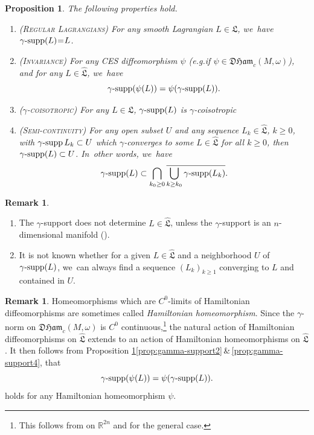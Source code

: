 \documentclass[10pt]{amsart}
\newtheorem{prop}[thm]{Proposition}
\theoremstyle{definition}
\newtheorem{rem}[thm]{Remark}
\DeclareMathOperator{\gammasupp}{\gamma\textup{-supp}}
\newcommand{\DHam}{\mathfrak{DHam}}
\newcommand{\fL}{\mathfrak {L}}
\newcommand{\hatL}{\widehat{\fL}}
\providecommand{\skpt}{\par\smallskip\noindent}
\providecommand{\eg}{e.g.}\providecommand{\ie}{i.e.}\providecommand{\etc}{etc.}
\begin{document}
\begin{prop}\label{prop:gamma-support}
The following properties hold.
\begin{enumerate}
\item\label{prop:gamma-support1}\!\!\textsc{(Regular Lagrangians)} For any smooth Lagrangian $L\!\in\!\fL$, we~have \hbox{$\gammasupp(L)\mkern-4mu=\mkern-4mu L$}.
\item\label{prop:gamma-support2}\!\!\textsc{(Invariance)} For any CES diffeomorphism $\psi$ (\eg if $\psi\in\DHam_c(M,\omega)$), and for any $L\in\hatL$, we~have\vspace*{-3pt}
\begin{equation*}
\gammasupp(\psi(L))=\psi(\gammasupp(L)).
\end{equation*}
\item\label{prop:gamma-support3}\!\!\label{Prop-2.13-3}\textsc{($\gamma$\nobreakdash-coisotropic)} For any $L\in\fL$, $\gammasupp(L)$ is $\gamma$\nobreakdash-coisotropic

\item\label{prop:gamma-support4}\!\!\textsc{(Semi-continuity)} For any open subset $U$ and any sequence $L_k\in\hatL$, $k\geq0$, with $\gammasupp L_k\subset U$ which $\gamma$\nobreakdash-converges to some $L\in\hatL$ for all $k\geq0$, then $\gammasupp(L)\subset U$. In~other words, we~have\vspace*{-3pt}
\[
\gammasupp(L)\subset\bigcap_{k_0\geq0}\overline{\bigcup_{k\geq k_0}\gammasupp(L_k)}.
\]
\end{enumerate}
\end{prop}

\skpt
\begin{rem}
\begin{enumerate}
\item The $\gamma$\nobreakdash-support does not determine $L\in \hatL$, unless the $\gamma$\nobreakdash-support is an $n$\nobreakdash-dimensional manifold (\cite{AGIV}).
\item It is not known whether for a given $L\in\hatL$ and a neighborhood $U$ of $\gammasupp(L)$, we~can always find a sequence $(L_k)_{k\geq 1}$ converging to $L$ and contained in $U$.
\end{enumerate}
\end{rem}

\begin{rem}\label{rem:sympeo} Homeomorphisms which are $C^0$-limits of Hamiltonian diffeomorphisms are sometimes called \emph{Hamiltonian homeomorphism}. Since the $\gamma$\nobreakdash-norm on $\DHam_c(M,\omega)$ is $C^0$ continuous,\footnote{This follows from \cite{Viterbo-STAGGF} on $\mathbb R^{2n}$ and \cite{BHS-C0} for the general case.} the natural action of Hamiltonian diffeomorphisms on $\hatL$ extends to an action of Hamiltonian homeomorphisms on $\hatL$. It then follows from Proposition \ref{prop:gamma-support}\eqref{prop:gamma-support2}\,\&\,\eqref{prop:gamma-support4}, that\vspace*{-3pt}
\begin{equation*}
\gammasupp(\psi(L))=\psi(\gammasupp(L)).
\end{equation*}
holds for any Hamiltonian homeomorphism $\psi$.
\end{rem}
\end{document}
